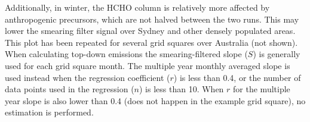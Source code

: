     Additionally, in winter, the HCHO column is relatively more affected by anthropogenic precursors, which are not halved between the two runs.
    This may lower the smearing filter signal over Sydney and other densely populated areas.
    This plot has been repeated for several grid squares over Australia (not shown).
    When calculating top-down emissions the smearing-filtered slope ($S$) is generally used for each grid square month.
    The multiple year monthly averaged slope is used instead when the regression coefficient ($r$) is less than 0.4, or the number of data points used in the regression ($n$) is less than 10.
    When $r$ for the multiple year slope is also lower than 0.4 (does not happen in the example grid square), no estimation is performed.%
    
    
    
